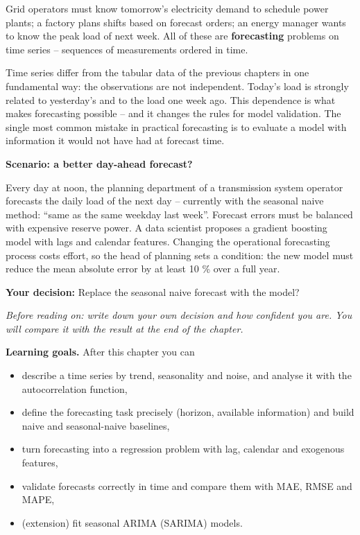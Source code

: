 \documentclass[
  letterpaper,
  DIV=11,
  numbers=noendperiod]{scrreprt}
\providecommand{\tightlist}{%
  \setlength{\itemsep}{0pt}\setlength{\parskip}{0pt}}\usepackage{longtable,booktabs,array}
\begin{document}
Grid operators must know tomorrow's electricity demand to schedule power
plants; a factory plans shifts based on forecast orders; an energy
manager wants to know the peak load of next week. All of these are
\textbf{forecasting} problems on time series -- sequences of
measurements ordered in time.

Time series differ from the tabular data of the previous chapters in one
fundamental way: the observations are not independent. Today's load is
strongly related to yesterday's and to the load one week ago. This
dependence is what makes forecasting possible -- and it changes the
rules for model validation. The single most common mistake in practical
forecasting is to evaluate a model with information it would not have
had at forecast time.

\textbf{Scenario: a better day-ahead forecast?}

Every day at noon, the planning department of a transmission system
operator forecasts the daily load of the next day -- currently with the
seasonal naive method: ``same as the same weekday last week''. Forecast
errors must be balanced with expensive reserve power. A data scientist
proposes a gradient boosting model with lags and calendar features.
Changing the operational forecasting process costs effort, so the head
of planning sets a condition: the new model must reduce the mean
absolute error by at least 10 \% over a full year.

\textbf{Your decision:} Replace the seasonal naive forecast with the
model?

\emph{Before reading on: write down your own decision and how confident
you are. You will compare it with the result at the end of the chapter.}

\textbf{Learning goals.} After this chapter you can

\begin{itemize}
\tightlist
\item
  describe a time series by trend, seasonality and noise, and analyse it
  with the autocorrelation function,
\item
  define the forecasting task precisely (horizon, available information)
  and build naive and seasonal-naive baselines,
\item
  turn forecasting into a regression problem with lag, calendar and
  exogenous features,
\item
  validate forecasts correctly in time and compare them with MAE, RMSE
  and MAPE,
\item
  (extension) fit seasonal ARIMA (SARIMA) models.
\end{itemize}
\end{document}
